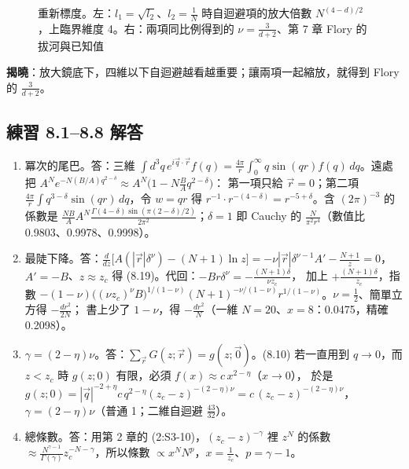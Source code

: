 \begin{figure}[htbp]
\centering
{\footnotesize\setlength{\tabcolsep}{4pt}\EightTabAmp\hfill\EightTabNu}
\caption{重新標度。左：$l_1=\sqrt{l_2}$、$l_2=\frac1N$ 時自迴避項的放大倍數 $N^{(4-d)/2}$，上臨界維度 4。右：兩項同比例得到的 $\nu=\frac3{d+2}$、第 7 章 Flory 的拔河與已知值}\label{eight-fig-flory}
\end{figure}

\textbf{揭曉}：放大鏡底下，四維以下自迴避越看越重要；讓兩項一起縮放，就得到 Flory 的 $\frac3{d+2}$。

\subsection{練習 8.1--8.8 解答}
{\small
\begin{enumerate}[label=\textbf{8.\arabic*},itemsep=0.05em]
\item 冪次的尾巴。\quad 答：三維 $\int d^3q\,e^{i\vec q\cdot\vec r}f(q)=\frac{4\pi}r\int_0^\infty q\sin(qr)f(q)\,dq$。遠處把 $A^Ne^{-N(B/A)q^{2-\delta}}\approx A^N\big(1-N\frac BAq^{2-\delta}\big)$：
第一項只給 $\vec r=0$；第二項 $\frac{4\pi}r\int q^{3-\delta}\sin(qr)\,dq$，令 $w=qr$ 得 $r^{-1}\cdot r^{-(4-\delta)}=r^{-5+\delta}$。含 $(2\pi)^{-3}$ 的係數是
$\frac{NB}{A}A^N\frac{\Gamma(4-\delta)\sin(\pi(2-\delta)/2)}{2\pi^2}$；$\delta=1$ 即 Cauchy 的 $\frac{N}{\pi^2r^4}$（數值比 0.9803、0.9978、0.9998）。
\item 最陡下降。\quad 答：$\frac{d}{dz}\big[A(|\vec r|\delta^\nu)-(N+1)\ln z\big]=-\nu|\vec r|\delta^{\nu-1}A'-\frac{N+1}z=0$，$A'=-B$、$z\approx z_c$ 得 (8.19)。代回：$-Br\delta^\nu=-\frac{(N+1)\delta}{\nu z_c}$，
加上 $+\frac{(N+1)\delta}{z_c}$，指數 $-(1-\nu)\big((\nu z_c)^\nu B\big)^{1/(1-\nu)}(N+1)^{-\nu/(1-\nu)}r^{1/(1-\nu)}$。$\nu=\frac12$、簡單立方得 $-\frac{dr^2}{2N}$；
書上少了 $1-\nu$，得 $-\frac{dr^2}N$（一維 $N=20$、$x=8$：0.0475，精確 0.2098）。
\item $\gamma=(2-\eta)\nu$。\quad 答：$\sum_{\vec r}G(z;\vec r)=g(z;\vec 0)$。(8.10) 若一直用到 $q\to0$，而 $z<z_c$ 時 $g(z;0)$ 有限，必須 $f(x)\approx c\,x^{2-\eta}$（$x\to0$），
於是 $g(z;0)=|\vec q|^{-2+\eta}c\,q^{2-\eta}(z_c-z)^{-(2-\eta)\nu}=c\,(z_c-z)^{-(2-\eta)\nu}$，$\gamma=(2-\eta)\nu$（普通 1；二維自迴避 $\frac{43}{32}$）。
\item 總條數。\quad 答：用第 2 章的 (2:S3-10)，$(z_c-z)^{-\gamma}$ 裡 $z^N$ 的係數 $\approx\frac{N^{\gamma-1}}{\Gamma(\gamma)}z_c^{-N-\gamma}$，所以條數 $\propto x^NN^p$，$x=\frac1{z_c}$、$p=\gamma-1$。

\end{enumerate}}

